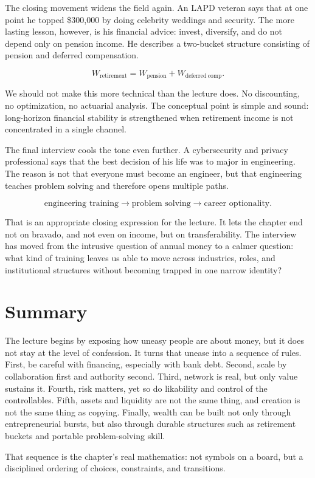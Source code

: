 The closing movement widens the field again. An LAPD veteran says that at one point he topped \$300{,}000 by doing celebrity weddings and security. The more lasting lesson, however, is his financial advice: invest, diversify, and do not depend only on pension income. He describes a two-bucket structure consisting of pension and deferred compensation.

\begin{equation}
W_{\mathrm{retirement}} = W_{\mathrm{pension}} + W_{\mathrm{deferred\ comp}}.
\end{equation}

We should not make this more technical than the lecture does. No discounting, no optimization, no actuarial analysis. The conceptual point is simple and sound: long-horizon financial stability is strengthened when retirement income is not concentrated in a single channel.

The final interview cools the tone even further. A cybersecurity and privacy professional says that the best decision of his life was to major in engineering. The reason is not that everyone must become an engineer, but that engineering teaches problem solving and therefore opens multiple paths.

\begin{equation}
\text{engineering training} \longrightarrow \text{problem solving} \longrightarrow \text{career optionality}.
\end{equation}

That is an appropriate closing expression for the lecture. It lets the chapter end not on bravado, and not even on income, but on transferability. The interview has moved from the intrusive question of annual money to a calmer question: what kind of training leaves us able to move across industries, roles, and institutional structures without becoming trapped in one narrow identity?

\section{Summary}

The lecture begins by exposing how uneasy people are about money, but it does not stay at the level of confession. It turns that unease into a sequence of rules. First, be careful with financing, especially with bank debt. Second, scale by collaboration first and authority second. Third, network is real, but only value sustains it. Fourth, risk matters, yet so do likability and control of the controllables. Fifth, assets and liquidity are not the same thing, and creation is not the same thing as copying. Finally, wealth can be built not only through entrepreneurial bursts, but also through durable structures such as retirement buckets and portable problem-solving skill.

That sequence is the chapter's real mathematics: not symbols on a board, but a disciplined ordering of choices, constraints, and transitions.